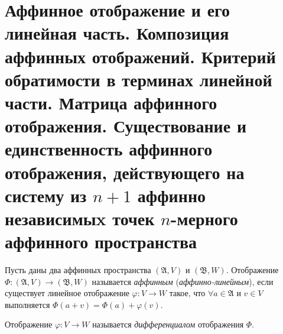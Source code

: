 \section{Аффинное отображение и его линейная часть. Композиция аффинных отображений. Критерий обратимости в терминах линейной части. Матрица аффинного отображения. Существование и единственность аффинного отображения, действующего на систему из $n + 1$ аффинно независимыx точек $n$-мерного аффинного пространства}

\renewcommand{\A}{\mathfrak{A}}
\renewcommand{\B}{\mathfrak{B}}

\begin{definition}
    Пусть даны два аффинных пространства $(\A, V)$ и $(\B, W)$. Отображение $\Phi: (\A, V) \to (\B, W)$ называется \textit{аффинным} (\textit{аффинно-линейным}), если существует линейное отображение $\varphi: V \to W$ такое, что $\forall a \in \A$ и $v \in V$ выполняется $\Phi(a + v) = \Phi(a) + \varphi(v)$.

    Отображение $\varphi: V \to W$ называется \textit{дифференциалом} отображения $\Phi$.
\end{definition}

\renewcommand{\A}{\mathcal{A}}
\renewcommand{\B}{\mathcal{B}}


